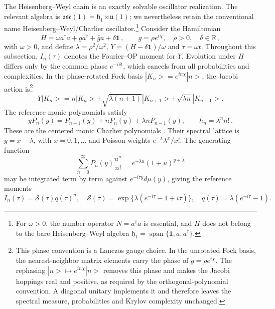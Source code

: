 \documentclass[a4paper,11pt]{article}
\def\ket#1{|#1>}%
\def\dd{d}%
\def\ii{i}%
\def\ee{e}%
\theoremstyle{definition}
\theoremstyle{remark}
\newcommand{\ket}[1]{|#1\rangle}
\newcommand{\dd}{\mathrm d}
\newcommand{\ii}{\mathrm i}
\newcommand{\ee}{\mathrm e}
\newcommand{\RR}{\mathbb R}
\newcommand{\Id}{\mathbf 1}
\newcommand{\Span}{\operatorname{span}}
\newcommand{\cS}{\mathcal S}
\begin{document}
The Heisenberg--Weyl chain is an exactly solvable oscillator realization. The relevant algebra is $\mathfrak{osc}(1)=\mathfrak h_1\rtimes\mathfrak u(1)$; we nevertheless retain the conventional name Heisenberg--Weyl/Charlier oscillator.\footnote{For $\omega>0$, the number operator $N=a^\dagger a$ is essential, and $H$ does not belong to the bare Heisenberg--Weyl algebra $\mathfrak h_1=\Span\{\Id,a,a^\dagger\}$.} Consider the Hamiltonian
\begin{equation}
   H=\omega a^\dagger a+g a^\dagger+\bar g a+\delta\Id\,,
   \qquad g=\rho\ee^{\ii\chi},\quad \rho>0,\quad \delta\in\RR\,,
   \label{eq:H1-ham}
\end{equation}
with $\omega>0$, and define $\lambda=\rho^2/\omega^2$, $Y=(H-\delta\Id)/\omega$ and $\tau=\omega t$. Throughout this subsection, \(I_n(\tau)\) denotes the Fourier--OP moment for \(Y\). Evolution under \(H\) differs only by the common phase \(\ee^{-\ii\delta t}\), which cancels from all probabilities and complexities. In the phase-rotated Fock basis \(\ket{K_n}=\ee^{\ii n\chi}\ket{n}\), the Jacobi action is\footnote{This phase convention is a Lanczos gauge choice. In the unrotated Fock basis, the nearest-neighbor matrix elements carry the phase of \(g=\rho\ee^{\ii\chi}\). The rephasing \(\ket n\mapsto\ee^{\ii n\chi}\ket n\) removes this phase and makes the Jacobi hoppings real and positive, as required by the orthogonal-polynomial convention. A diagonal unitary implements it and therefore leaves the spectral measure, probabilities and Krylov complexity unchanged.}
\begin{equation}
Y\ket{K_n}=n\ket{K_n}+\sqrt{\lambda(n+1)}\ket{K_{n+1}}+\sqrt{\lambda n}\ket{K_{n-1}}.
   \label{eq:H1-jacobi}
\end{equation}
The reference monic polynomials satisfy
\begin{equation}
   yP_n(y)=P_{n+1}(y)+nP_n(y)+\lambda nP_{n-1}(y),
   \qquad h_n=\lambda^n n!\,.
   \label{eq:Charlier-recurrence-main}
\end{equation}
These are the centered monic Charlier polynomials \cite{Chihara1978}. Their spectral lattice is $y=x-\lambda$, with $x=0,1,\ldots$ and Poisson weights $\ee^{-\lambda}\lambda^x/x!$. The generating function
\begin{equation}
   \sum_{n=0}^{\infty}P_n(y)\frac{u^n}{n!}
   =\ee^{-\lambda u}(1+u)^{y+\lambda}
   \label{eq:Charlier-gen-main}
\end{equation}
may be integrated term by term against $\ee^{-\ii\tau y}\dd\mu(y)$, giving the reference moments
\begin{equation}
   I_n(\tau)=\cS(\tau)q(\tau)^n,
   \quad
   \cS(\tau)=\exp\{\lambda(\ee^{-\ii\tau}-1+\ii\tau)\},
   \quad q(\tau)=\lambda(\ee^{-\ii\tau}-1).
   \label{eq:H1-old-moments-main}
\end{equation}
\end{document}
